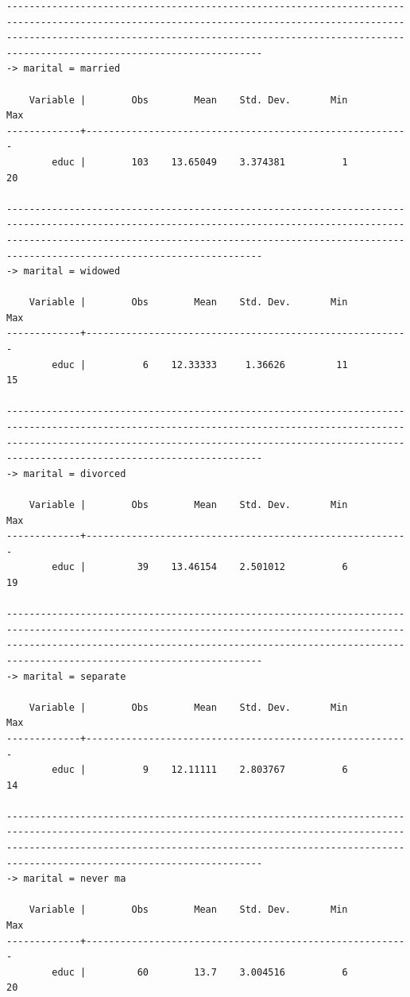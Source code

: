 \documentclass[]{book}
\begin{document}
\begin{verbatim}
---------------------------------------------------------------------------------------------------------------------------------------------------------------------------------------------------------------------------------------------------------------
-> marital = married

    Variable |        Obs        Mean    Std. Dev.       Min        Max
-------------+---------------------------------------------------------
        educ |        103    13.65049    3.374381          1         20

---------------------------------------------------------------------------------------------------------------------------------------------------------------------------------------------------------------------------------------------------------------
-> marital = widowed

    Variable |        Obs        Mean    Std. Dev.       Min        Max
-------------+---------------------------------------------------------
        educ |          6    12.33333     1.36626         11         15

---------------------------------------------------------------------------------------------------------------------------------------------------------------------------------------------------------------------------------------------------------------
-> marital = divorced

    Variable |        Obs        Mean    Std. Dev.       Min        Max
-------------+---------------------------------------------------------
        educ |         39    13.46154    2.501012          6         19

---------------------------------------------------------------------------------------------------------------------------------------------------------------------------------------------------------------------------------------------------------------
-> marital = separate

    Variable |        Obs        Mean    Std. Dev.       Min        Max
-------------+---------------------------------------------------------
        educ |          9    12.11111    2.803767          6         14

---------------------------------------------------------------------------------------------------------------------------------------------------------------------------------------------------------------------------------------------------------------
-> marital = never ma

    Variable |        Obs        Mean    Std. Dev.       Min        Max
-------------+---------------------------------------------------------
        educ |         60        13.7    3.004516          6         20
\end{verbatim}
\end{document}
